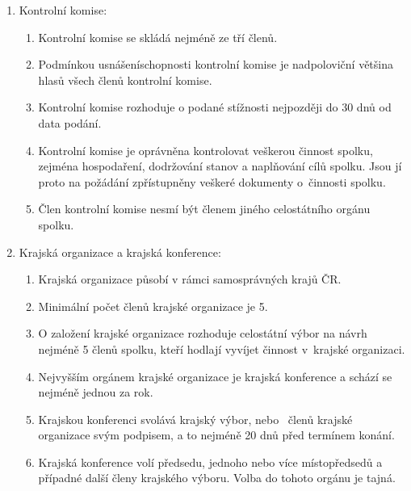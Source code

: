 \documentclass[a4paper]{article}
\begin{document}
\begin{enumerate}
\begin{enumerate}
        \end{enumerate}

    \item Kontrolní komise:
        \begin{enumerate}
        \item Kontrolní komise se skládá nejméně ze tří členů.

        \item Podmínkou usnášeníschopnosti kontrolní komise je nadpoloviční většina
            hlasů všech členů kontrolní komise.

        \item Kontrolní komise rozhoduje o podané stížnosti nejpozději do
            30 dnů od data podání.

        \item Kontrolní komise je oprávněna kontrolovat veškerou činnost
            spolku, zejména hospodaření, dodržování stanov a naplňování cílů
            spolku. Jsou jí proto na požádání zpřístupněny veškeré dokumenty
            o~činnosti spolku.
            
        \item Člen kontrolní komise nesmí být členem jiného celostátního orgánu spolku.
        \end{enumerate}

    \item Krajská organizace a krajská konference:
        \begin{enumerate}
        \item Krajská organizace působí v rámci samosprávných krajů ČR.

        \item Minimální počet členů krajské organizace je 5.

        \item O založení krajské organizace rozhoduje celostátní výbor
            na návrh nejméně 5 členů spolku, kteří hodlají vyvíjet činnost
            v~krajské organizaci.

        \item Nejvyšším orgánem krajské organizace je krajská konference a
            schází se nejméně jednou za rok.

        \item Krajskou konferenci svolává krajský výbor, nebo
            ~členů krajské organizace svým podpisem, a to
            nejméně 20 dnů před termínem konání.

        \item Krajská konference volí předsedu, jednoho nebo více
            místopředsedů a případné další členy krajského výboru.
            Volba do tohoto orgánu je tajná.


\end{enumerate}
\end{enumerate}
\end{document}
